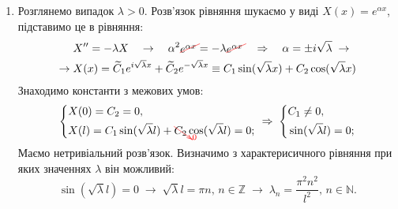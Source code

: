 \documentclass[a4paper, 14pt]{extreport}
\begin{document}
\begin{enumerate}
\begin{enumerate}
        \item Розглянемо випадок $\lambda > 0$. Розв'язок рівняння шукаємо у виді $X(x) = e^{\alpha x}$, підставимо це в рівняння: 
        \begin{equation*}
            \begin{aligned}
                &X^{\prime\prime} = -\lambda X
                \quad\to\quad
                \alpha^2 \textcolor{red}{\begin{xy}*{\textcolor{black}{e^{\alpha x}}};p+LD;+RU**h@{}+/\jot/**h@{-}\end{xy}} = -\lambda \textcolor{red}{\begin{xy}*{\textcolor{black}{e^{\alpha x}}};p+LD;+RU**h@{}+/\jot/**h@{-}\end{xy}}
                \quad\Rightarrow\quad
                \alpha = \pm i\sqrt{\lambda}
                \;\to\\
                \to\;
                &X(x) = \widetilde{C}_1 e^{i\sqrt{\lambda}x} + \widetilde{C}_2 e^{-\sqrt{\lambda}x} \equiv C_1 \sin(\sqrt{\lambda}x) + C_2 \cos({\sqrt{\lambda}x})
            \end{aligned}
        \end{equation*}
        Знаходимо константи з межових умов:
        \begin{equation*}
            \begin{aligned}
                \left\{ \begin{aligned}
                    &X(0) = C_2 = 0, \\ 
                    &X(l) = C_1 \sin(\sqrt{\lambda}l) + \textcolor{red}{\begin{xy}*{\textcolor{black}{C_2}};p+LU;+RD**h@{}+//**h@{-}*h@{>}*h!LD{\scriptstyle 0}\end{xy}} \cos({\sqrt{\lambda}l}) = 0;
                \end{aligned} \right.
                \;\Rightarrow\;
                \left\{ \begin{aligned}
                    &C_1 \neq 0, \\ 
                    &\sin(\sqrt{\lambda}l) = 0;
                \end{aligned} \right.
            \end{aligned}
        \end{equation*}
        Маємо нетривіальний розв'язок. Визначимо з характерисичного рівняння при яких значеннях $\lambda$ він можливий:
        \begin{equation*}
            \sin(\sqrt{\lambda}l) = 0
            \;\to\;
            \sqrt{\lambda}l = \pi n, \, n \in \mathbb{Z}
            \;\to\;
            \lambda_n = \frac{\pi^2 n^2}{l^2}, \, n \in \mathbb{N}.
        \end{equation*}
    \end{enumerate}
\end{enumerate} 
\end{document}
